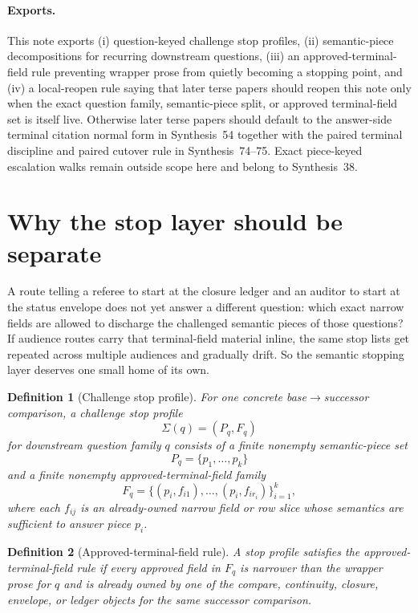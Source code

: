 \documentclass[11pt]{article}
\newtheorem{definition}{Definition}
\begin{document}
\paragraph{Exports.}
This note exports (i) question-keyed challenge stop profiles, (ii) semantic-piece decompositions for recurring downstream questions, (iii) an approved-terminal-field rule preventing wrapper prose from quietly becoming a stopping point, and (iv) a local-reopen rule saying that later terse papers should reopen this note only when the exact question family, semantic-piece split, or approved terminal-field set is itself live. Otherwise later terse papers should default to the answer-side terminal citation normal form in Synthesis~54 together with the paired terminal discipline and paired cutover rule in Synthesis~74--75. Exact piece-keyed escalation walks remain outside scope here and belong to Synthesis~38.\cite{series:challengebranches,series:challengeanswerreviewmenus,series:pairedterminalcitationdiscipline,series:pairedterminalcutoverrules}

\section{Why the stop layer should be separate}
A route telling a referee to start at the closure ledger and an auditor to start at the status envelope does not yet answer a different question: which exact narrow fields are allowed to discharge the challenged semantic pieces of those questions?
If audience routes carry that terminal-field material inline, the same stop lists get repeated across multiple audiences and gradually drift.
So the semantic stopping layer deserves one small home of its own.

\begin{definition}[Challenge stop profile]
For one concrete base$\to$successor comparison, a \emph{challenge stop profile}
\[
\Sigma(q)=(P_q,F_q)
\]
for downstream question family $q$ consists of a finite nonempty semantic-piece set
\[
P_q=\{p_1,\dots,p_k\}
\]
and a finite nonempty approved-terminal-field family
\[
F_q=\{(p_i,f_{i1}),\dots,(p_i,f_{ir_i})\}_{i=1}^k,
\]
where each $f_{ij}$ is an already-owned narrow field or row slice whose semantics are sufficient to answer piece $p_i$.
\end{definition}

\begin{definition}[Approved-terminal-field rule]
A stop profile satisfies the \emph{approved-terminal-field rule} if every approved field in $F_q$ is narrower than the wrapper prose for $q$ and is already owned by one of the compare, continuity, closure, envelope, or ledger objects for the same successor comparison.
\end{definition}
\end{document}
